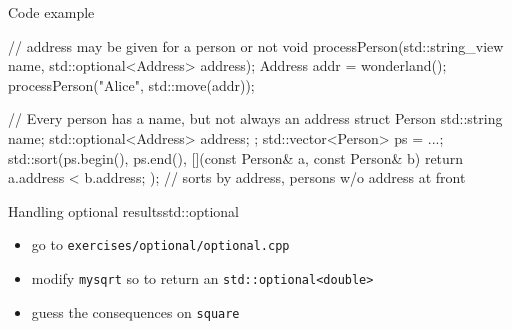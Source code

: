 \begin{frame}[fragile]
  \begin{exampleblock}{Code example}
    \small
    \begin{cppcode*}{}
      // address may be given for a person or not
      void processPerson(std::string_view name,
                         std::optional<Address> address);
      Address addr = wonderland();
      processPerson("Alice", std::move(addr));

      // Every person has a name, but not always an address
      struct Person {
        std::string name;
        std::optional<Address> address;
      };
      std::vector<Person> ps = ...;
      std::sort(ps.begin(), ps.end(),
                [](const Person& a, const Person& b) {
        return a.address < b.address;
      }); // sorts by address, persons w/o address at front
    \end{cppcode*}
  \end{exampleblock}
\end{frame}

\begin{frame}[fragile]
  \begin{exerciseWithShortcut}{Handling optional results}{std::optional}
    \begin{itemize}
      \item go to \texttt{exercises/optional/optional.cpp}
      \item modify \texttt{mysqrt} so to return an \texttt{std::optional<double>}
      \item guess the consequences on \texttt{square}
    \end{itemize}
  \end{exerciseWithShortcut}
\end{frame}


